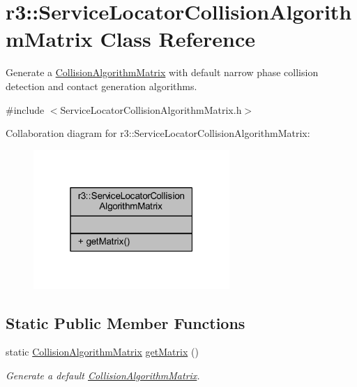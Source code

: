 \hypertarget{classr3_1_1_service_locator_collision_algorithm_matrix}{}\section{r3\+:\+:Service\+Locator\+Collision\+Algorithm\+Matrix Class Reference}
\label{classr3_1_1_service_locator_collision_algorithm_matrix}


Generate a \mbox{\hyperlink{classr3_1_1_collision_algorithm_matrix}{Collision\+Algorithm\+Matrix}} with default narrow phase collision detection and contact generation algorithms.  




{\ttfamily \#include $<$Service\+Locator\+Collision\+Algorithm\+Matrix.\+h$>$}



Collaboration diagram for r3\+:\+:Service\+Locator\+Collision\+Algorithm\+Matrix\+:\nopagebreak
\begin{figure}[H]
\begin{center}
\leavevmode
\includegraphics[width=211pt]{classr3_1_1_service_locator_collision_algorithm_matrix__coll__graph}
\end{center}
\end{figure}
\subsection*{Static Public Member Functions}
\begin{DoxyCompactItemize}
\item 
static \mbox{\hyperlink{classr3_1_1_collision_algorithm_matrix}{Collision\+Algorithm\+Matrix}} \mbox{\hyperlink{classr3_1_1_service_locator_collision_algorithm_matrix_a3616f828528161b552f5c3bc5dc6aa65}{get\+Matrix}} ()
\begin{DoxyCompactList}\small\item\em Generate a default \mbox{\hyperlink{classr3_1_1_collision_algorithm_matrix}{Collision\+Algorithm\+Matrix}}. \end{DoxyCompactList}\end{DoxyCompactItemize}


